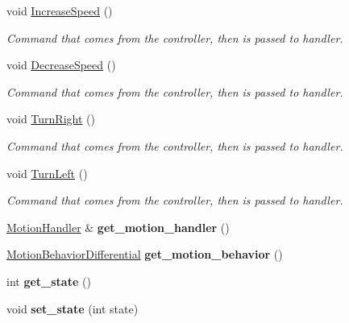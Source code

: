 \begin{DoxyCompactItemize}
\mbox{\label{class_light_a3a8b57cc040b0ab220cbc89d947fd2ab}} 
void \mbox{\hyperlink{class_light_a3a8b57cc040b0ab220cbc89d947fd2ab}{Increase\+Speed}} ()
\begin{DoxyCompactList}\small\item\em Command that comes from the controller, then is passed to handler. \end{DoxyCompactList}\item 
\mbox{\label{class_light_ade825fe740b39f80aa934588e29d12f9}} 
void \mbox{\hyperlink{class_light_ade825fe740b39f80aa934588e29d12f9}{Decrease\+Speed}} ()
\begin{DoxyCompactList}\small\item\em Command that comes from the controller, then is passed to handler. \end{DoxyCompactList}\item 
\mbox{\label{class_light_a3d96e80148c96e450007da8358613187}} 
void \mbox{\hyperlink{class_light_a3d96e80148c96e450007da8358613187}{Turn\+Right}} ()
\begin{DoxyCompactList}\small\item\em Command that comes from the controller, then is passed to handler. \end{DoxyCompactList}\item 
\mbox{\label{class_light_a571db6b9e9478fbced0cf9212fa44fb4}} 
void \mbox{\hyperlink{class_light_a571db6b9e9478fbced0cf9212fa44fb4}{Turn\+Left}} ()
\begin{DoxyCompactList}\small\item\em Command that comes from the controller, then is passed to handler. \end{DoxyCompactList}\item 
\mbox{\label{class_light_a056a03454affa4a64dfd6188e5cf8f4d}} 
\mbox{\hyperlink{class_motion_handler}{Motion\+Handler}} \& {\bfseries get\+\_\+motion\+\_\+handler} ()
\item 
\mbox{\label{class_light_af8a67e1e3d3e6b21c169cfd6bdaa8ab2}} 
\mbox{\hyperlink{class_motion_behavior_differential}{Motion\+Behavior\+Differential}} {\bfseries get\+\_\+motion\+\_\+behavior} ()
\item 
\mbox{\label{class_light_ae7c1f02a58289be086e15e06df29a8dc}} 
int {\bfseries get\+\_\+state} ()
\item 
\mbox{\label{class_light_a1296a373c45d54eb68a16b648d100c6c}} 
void {\bfseries set\+\_\+state} (int state)
\end{DoxyCompactItemize}
